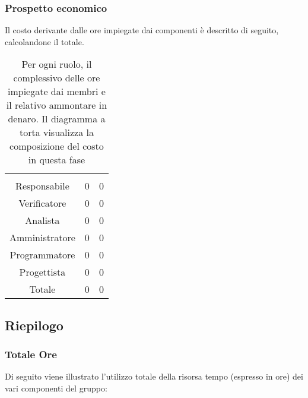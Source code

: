 \subsubsection{Prospetto economico}
Il costo derivante dalle ore impiegate dai componenti è descritto di seguito, calcolandone il totale.

\begin{table}[hbt!]
{\setlength{\parindent}{0cm}
\begin{minipage}{.43\textwidth}
	\begin{tabular}{ccc}
	\rowcolorhead
	\headertitle{Ruolo} & \headertitle{Ore} & \headertitle{Costo(€)}\\
	Responsabile & 0 & 0\\
	Verificatore & 0 & 0\\
	Analista & 0 & 0\\
	Amministratore & 0 & 0\\
	Programmatore & 0 & 0\\
	Progettista & 0 & 0\\
	\hline
	Totale & 0& 0\\
	\end{tabular}
\end{minipage}%
\begin{minipage}{.57\textwidth}
\end{minipage} }
\caption{Per ogni ruolo, il complessivo delle ore impiegate dai membri e il relativo ammontare in denaro. Il diagramma a torta visualizza la composizione del costo in questa fase}
\end{table}

\subsection{Riepilogo}

\subsubsection{Totale Ore}
Di seguito viene illustrato l'utilizzo totale della risorsa tempo (espresso in ore) dei vari componenti del gruppo:

